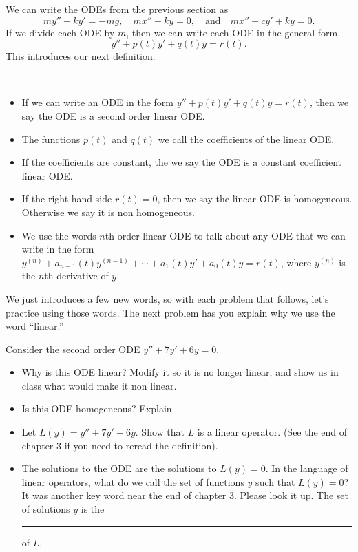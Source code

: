 We can write the ODEs from the previous section as
$$my''+ky'=-mg,
\quad mx''+ky=0,
\quad \text{and}\quad mx''+cy'+ky=0.$$
If we divide each ODE by $m$, then we can write each ODE in the general form 
$$y''+p(t) y'+q(t)y=r(t).$$
This introduces our next definition.
\begin{definition}
\
\begin{itemize}
 \item If we can write an ODE in the form  $y''+p(t)y'+q(t)y=r(t)$, then we say the ODE is a second order linear ODE. 
 \item The functions $p(t)$ and $q(t)$ we call the coefficients of the linear ODE.
 \item If the coefficients are constant, the we say the ODE is a constant coefficient linear ODE.   
 \item If the right hand side $r(t)=0$, then we say the linear ODE is homogeneous. Otherwise we say it is non homogeneous.
 \item We use the words $n$th order linear ODE to talk about any ODE that we can write in the form $y^{(n)}+a_{n-1}(t)y^{(n-1)} + \cdots + a_1(t)y'+a_0(t)y=r(t)$, where $y^{(n)}$ is the $n$th derivative of $y$. 
\end{itemize}
\end{definition}


We just introduces a few new words, so with each problem that follows, let's practice using those words. The next problem has you explain why we use the word ``linear.''

\begin{problem}
 Consider the second order ODE $y''+7y'+6y=0$.  
\begin{itemize}
 \item Why is this ODE linear?  Modify it so it is no longer linear, and show us in class what would make it non linear.
 \item Is this ODE homogeneous?  Explain.
 \item Let $L(y) = y''+7y'+6y$.  Show that $L$ is a linear operator. (See the end of chapter 3 if you need to reread the definition). 
 \item The solutions to the ODE are the solutions to $L(y)=0$.  In the language of linear operators, what do we call the set of functions $y$ such that $L(y)=0$?  It was another key word near the end of chapter 3.  Please look it up. The set of solutions $y$ is the \rule{1in}{.5pt} of $L$.
\end{itemize}
\end{problem}

